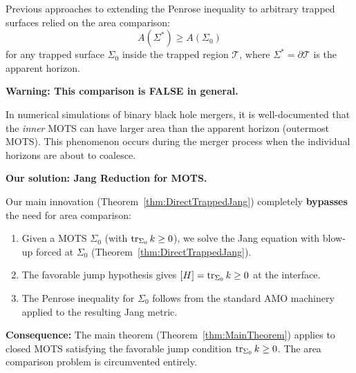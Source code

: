\begin{remark}\label{thm:OuterMinimizingHullAreaComparison}
Previous approaches to extending the Penrose inequality to arbitrary trapped surfaces relied on the area comparison:
\begin{equation}\label{eq:OuterMinHullAreaComparison}
    A(\Sigma^*) \ge A(\Sigma_0)
\end{equation}
for any trapped surface $\Sigma_0$ inside the trapped region $\mathcal{T}$, where $\Sigma^* = \partial\mathcal{T}$ is the apparent horizon.

\textbf{Warning: This comparison is FALSE in general.}

In numerical simulations of binary black hole mergers, it is well-documented that the \emph{inner} MOTS can have larger area than the apparent horizon (outermost MOTS). This phenomenon occurs during the merger process when the individual horizons are about to coalesce.

\textbf{Our solution: Jang Reduction for MOTS.}

Our main innovation (Theorem~\ref{thm:DirectTrappedJang}) completely \textbf{bypasses} the need for area comparison:
\begin{enumerate}
    \item Given a MOTS $\Sigma_0$ (with $\operatorname{tr}_{\Sigma_0} k \ge 0$), we solve the Jang equation with blow-up forced at $\Sigma_0$ (Theorem~\ref{thm:DirectTrappedJang}).
    \item The favorable jump hypothesis gives $[H] = \operatorname{tr}_{\Sigma_0} k \ge 0$ at the interface.
    \item The Penrose inequality for $\Sigma_0$ follows from the standard AMO machinery applied to the resulting Jang metric.
\end{enumerate}

\textbf{Consequence:} The main theorem (Theorem~\ref{thm:MainTheorem}) applies to closed MOTS satisfying the favorable jump condition $\operatorname{tr}_{\Sigma_0} k \ge 0$. The area comparison problem is circumvented entirely.
\end{remark}

